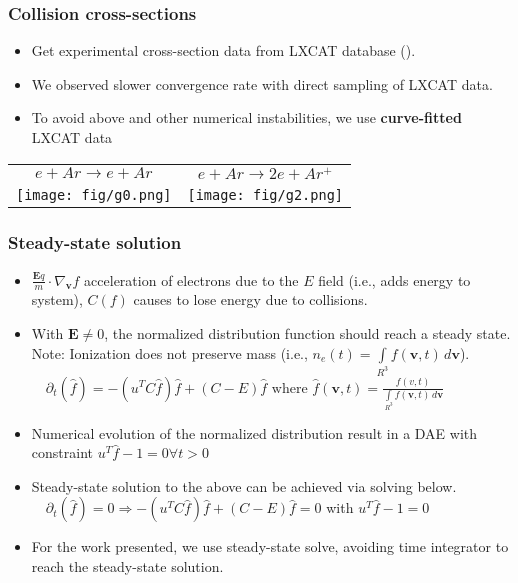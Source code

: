 \documentclass[mathserif, aspectratio=169]{beamer}
\newcommand{\vect}[1]{\boldsymbol{#1}}
\newcommand{\myint}{\int\limits}
\newcommand{\diff}[1]{\, d#1}
\begin{document}
\begin{frame}
	\frametitle{Collision cross-sections}
	\begin{itemize}
		\item Get experimental cross-section data from LXCAT database (). 
		\item We observed slower convergence rate with direct sampling of LXCAT data. 
		\item To avoid above and other numerical instabilities, we use \textbf{curve-fitted} LXCAT data%
	\end{itemize}
	\begin{center}
		\begin{tabular}{cc}
			$e + Ar \rightarrow e + Ar $ & $e + Ar \rightarrow 2e + Ar^+ $ \\
			\texttt{[image: fig/g0.png]} &  \texttt{[image: fig/g2.png]}
		\end{tabular}	
	\end{center}
\end{frame}

\begin{frame}
	\frametitle{Steady-state solution}
	\begin{itemize}
		\item $\frac{\vect{E} q}{m} \cdot \nabla_{\vect{v}}f$ acceleration of electrons due to the $E$ field (i.e., adds energy to system), $C(f)$ causes to lose energy due to collisions. 
		\item With $\vect{E}\neq 0$, the normalized distribution function should reach a steady state. Note: Ionization does not preserve mass (i.e., $n_e(t)=\myint_{R^3} f(\vect{v},t) \diff{\vect{v}}$).
		$
		\displaystyle
		\quad
		\partial_t (\hat{f}) = -(u^T C \hat{f}) \hat{f} + (C-E)\hat{f} \text{ where } \hat{f}(\vect{v},t) = \frac{f(v,t)}{\myint_{R^3} f(\vect{v},t) \diff{\vect{v}}}
		$
		\item Numerical evolution of the normalized distribution result in a DAE with constraint $u^T \hat{f}-1=0 \forall t>0$
		\item Steady-state solution to the above can be achieved via solving below.  
		$
		\displaystyle
		\quad
		\partial_t (\hat{f}) = 0 \Rightarrow -(u^T C \hat{f}) \hat{f} + (C-E)\hat{f} =0
		$ with $u^T \hat{f}-1=0$
		\item For the work presented, we use steady-state solve, avoiding time integrator to reach the steady-state solution. 
	\end{itemize}
\end{frame}
\end{document}
